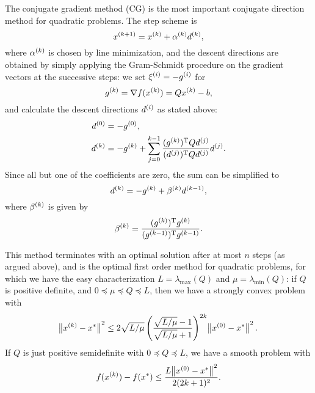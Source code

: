 \documentclass{article}
\begin{document}
\label{s:conjugate-gradient-method}

The conjugate gradient method (CG) is the most important conjugate direction method for quadratic
problems.  The step scheme is
\begin{equation*}
  \kth[k+1]{x} = \kth{x} + \kth{\alpha}\kth{d},
\end{equation*}
where \(\kth{\alpha}\) is chosen by line minimization, and the descent directions are obtained by
simply applying the Gram-Schmidt procedure on the gradient vectors at the successive steps: we set
\(\kth[i]{\xi} = -\kth[i]{g}\) for
\begin{equation*}
  \kth{g} = \nabla f(\kth{x}) = Q \kth{x} - b,
\end{equation*}
and calculate the descent directions \(\kth[i]{d}\) as stated above:
\begin{align*}
  \kth[0]{d} &= -\kth[0]{g}, \\
  \kth[k]{d} &= -\kth[k]{g} + \sum_{j=0}^{k-1}
               \frac{\T{(\kth[k]{g})} Q \kth[j]{d}}{\T{(\kth[j]{d})} Q \kth[j]{d}} \kth[j]{d}.
\end{align*}
Since all but one of the coefficients are zero, the sum can be simplified to
\begin{equation*}
  \kth{d} = -\kth{g} + \kth{\beta}\kth[k-1]{d},
\end{equation*}
where \(\kth{\beta}\) is given by
\begin{equation*}
  \kth{\beta} = \frac{\T{(\kth{g})}\kth{g}}{\T{(\kth[k-1]{g})}\kth[k-1]{g}}.
\end{equation*}

This method terminates with an optimal solution after at most \(n\) steps (as argued above), and is
the optimal first order method for quadratic problems, for which we have the easy characterization
\(L = \lambda_{\text{max}}(Q)\) and \(\mu = \lambda_{\text{min}}(Q)\): if \(Q\) is positive
definite, and \(0 \preceq \mu \preceq Q \preceq L\), then we have a strongly convex problem with
\begin{equation*}
  \enVert[1]{\kth{x} - x^*}^2 \leq 2\sqrt{L/\mu} \left( \frac{\sqrt{L/\mu}-1}{\sqrt{L/\mu}+1} \right)^{2k}
  \enVert[1]{\kth[0]{x} - x^*}^2.
\end{equation*}
If \(Q\) is just positive semidefinite with \(0 \preceq Q \preceq L\), we have a smooth problem with
\begin{equation*}
  f(\kth{x}) - f(x^*) \leq \frac{L \enVert[1]{\kth[0]{x} - x^*}^2}{2 (2k + 1)^2}.
\end{equation*}
\end{document}
